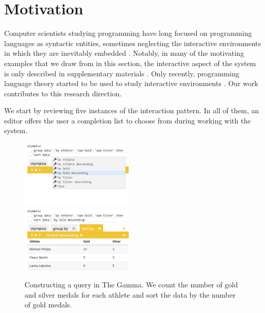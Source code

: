 \documentclass[anonymous, a4paper,UKenglish,cleveref, autoref, thm-restate]{lipics-v2021}
\begin{document}

\section{Motivation}
\label{sec:motivation}

Computer scientists studying programming have long focused on programming languages as syntactic
entities, sometimes neglecting the interactive environments in which they are inevitably
embedded \cite{rpg-2012-revolution}. Notably, in many of the motivating examples that we draw
from in this section, the interactive aspect of the system is only described in supplementary
materials \cite{brady-2015-idris,syme-2013-inforich,altenkirch-1994-alf}. Only recently, programming
language theory started to be used to study interactive environments
\cite{adams-2025-grove,mayer-2018-bidirectional}. Our work contributes to this research direction.

We start by reviewing five instances of the interaction pattern. In all of them, an editor
offers the user a completion list to choose from during working with the system.

\begin{figure}[t]
\vspace{-0.5em}
\includegraphics[width=0.48\textwidth]{fig/thegamma1.png}~~
\includegraphics[width=0.48\textwidth]{fig/thegamma2.png}
\caption{Constructing a query in The Gamma. We count the number of gold and silver medals for
each athlete and sort the data by the number of gold medals.}
\vspace{-0.5em}
\label{fig:thegamma}
\end{figure}
\end{document}
